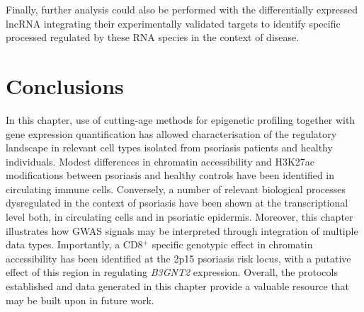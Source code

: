 Finally, further analysis could also be performed with the differentially expressed lncRNA integrating their experimentally validated targets to identify specific processed regulated by these RNA species in the context of disease. %

\section{Conclusions}
In this chapter, use of cutting-age methods for epigenetic profiling together with gene expression quantification has allowed characterisation of the regulatory landscape in relevant cell types isolated from psoriasis patients and healthy individuals. Modest differences in chromatin accessibility and H3K27ac modifications between psoriasis and healthy controls have been identified in circulating immune cells. Conversely, a number of relevant biological processes dysregulated in the context of psoriasis have been shown at the transcriptional level both, in circulating cells and in psoriatic epidermis. Moreover, this chapter illustrates how GWAS signals may be interpreted through integration of multiple data types. Importantly,  a CD8$^+$ specific genotypic effect in chromatin accessibility has been identified at the 2p15 psoriasis risk locus, with a putative effect of this region in regulating \textit{B3GNT2} expression. Overall, the protocols established and data generated in this chapter provide a valuable resource that may be built upon in future work.



